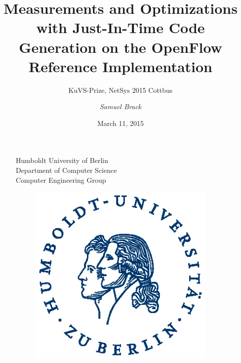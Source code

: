 \documentclass[xcolor=x11names,compress]{beamer}
\renewcommand{\(}{\begin{columns}}
\renewcommand{\)}{\end{columns}}
\newcommand{\<}[1]{\begin{column}{#1}}
\renewcommand{\>}{\end{column}}
\begin{document}
\begin{frame}
  \begin{figure}
    \begin{minipage}[c]{0.6\textwidth} 
    \tiny{Humboldt University of Berlin\\Department of Computer Science\\Computer Engineering Group}
    \end{minipage}
    \hfill
    \begin{minipage}[c]{0.15\textwidth}
    \begin{figure}
      \includegraphics[width=\textwidth]{figures/HU_Logo}
    \end{figure}
    \end{minipage}
  \end{figure}

\title{\textbf{Measurements and Optimizations with Just-In-Time Code Generation on the OpenFlow Reference Implementation}}
\subtitle{KuVS-Prize, NetSys 2015 Cottbus}

\author{
  \vspace*{-1cm}
	\normalsize{\it Samuel Brack}\\
}
\date{March 11, 2015}
\titlepage
\end{frame}

\end{document}
